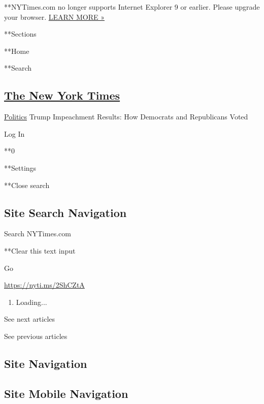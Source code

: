  **NYTimes.com no longer supports Internet Explorer 9 or earlier. Please
upgrade your browser.
\href{http://www.nytimes3xbfgragh.onion/content/help/site/ie9-support.html}{LEARN
MORE »}

**Sections

**Home

**Search

\hypertarget{the-new-york-times}{%
\subsection{\texorpdfstring{\href{http://www.nytimes3xbfgragh.onion/}{The
New York Times}}{The New York Times}}\label{the-new-york-times}}

 \href{/section/politics}{Politics} \textbar{}Trump Impeachment Results:
How Democrats and Republicans Voted

Log In

**0

**Settings

**Close search

\hypertarget{site-search-navigation}{%
\subsection{Site Search Navigation}\label{site-search-navigation}}

Search NYTimes.com

**Clear this text input

Go

\url{https://nyti.ms/2ShCZtA}

\begin{enumerate}
\def\labelenumi{\arabic{enumi}.}
\item
  Loading...
\end{enumerate}

See next articles

See previous articles

\hypertarget{site-navigation}{%
\subsection{Site Navigation}\label{site-navigation}}

\hypertarget{site-mobile-navigation}{%
\subsection{Site Mobile Navigation}\label{site-mobile-navigation}}

